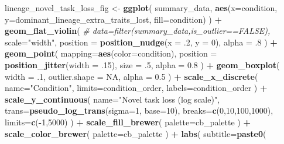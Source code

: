 \documentclass[]{book}
\newenvironment{Shaded}{\begin{snugshade}}{\end{snugshade}}
\newcommand{\CommentTok}[1]{\textcolor[rgb]{0.56,0.35,0.01}{\textit{#1}}}
\newcommand{\DataTypeTok}[1]{\textcolor[rgb]{0.13,0.29,0.53}{#1}}
\newcommand{\DecValTok}[1]{\textcolor[rgb]{0.00,0.00,0.81}{#1}}
\newcommand{\FloatTok}[1]{\textcolor[rgb]{0.00,0.00,0.81}{#1}}
\newcommand{\KeywordTok}[1]{\textcolor[rgb]{0.13,0.29,0.53}{\textbf{#1}}}
\newcommand{\NormalTok}[1]{#1}
\newcommand{\OperatorTok}[1]{\textcolor[rgb]{0.81,0.36,0.00}{\textbf{#1}}}
\newcommand{\OtherTok}[1]{\textcolor[rgb]{0.56,0.35,0.01}{#1}}
\newcommand{\StringTok}[1]{\textcolor[rgb]{0.31,0.60,0.02}{#1}}
\begin{document}
\begin{Shaded}
\begin{Highlighting}[]
{{{{\NormalTok{lineage_novel_task_loss_fig <-}\StringTok{ }\KeywordTok{ggplot}\NormalTok{(}
\NormalTok{    summary_data,}
    \KeywordTok{aes}\NormalTok{(}\DataTypeTok{x=}\NormalTok{condition, }\DataTypeTok{y=}\NormalTok{dominant_lineage_extra_traits_lost, }\DataTypeTok{fill=}\NormalTok{condition)}
\NormalTok{  ) }\OperatorTok{+}
\StringTok{  }\KeywordTok{geom_flat_violin}\NormalTok{(}
    \CommentTok{# data=filter(summary_data,is_outlier==FALSE),}
    \DataTypeTok{scale=}\StringTok{"width"}\NormalTok{,}
    \DataTypeTok{position =} \KeywordTok{position_nudge}\NormalTok{(}\DataTypeTok{x =} \FloatTok{.2}\NormalTok{, }\DataTypeTok{y =} \DecValTok{0}\NormalTok{),}
    \DataTypeTok{alpha =} \FloatTok{.8}
\NormalTok{  ) }\OperatorTok{+}
\StringTok{  }\KeywordTok{geom_point}\NormalTok{(}
    \DataTypeTok{mapping=}\KeywordTok{aes}\NormalTok{(}\DataTypeTok{color=}\NormalTok{condition),}
    \DataTypeTok{position =} \KeywordTok{position_jitter}\NormalTok{(}\DataTypeTok{width =} \FloatTok{.15}\NormalTok{),}
    \DataTypeTok{size =} \FloatTok{.5}\NormalTok{,}
    \DataTypeTok{alpha =} \FloatTok{0.8}
\NormalTok{  ) }\OperatorTok{+}
\StringTok{  }\KeywordTok{geom_boxplot}\NormalTok{(}
    \DataTypeTok{width =} \FloatTok{.1}\NormalTok{,}
    \DataTypeTok{outlier.shape =} \OtherTok{NA}\NormalTok{,}
    \DataTypeTok{alpha =} \FloatTok{0.5}
\NormalTok{  ) }\OperatorTok{+}
\StringTok{  }\KeywordTok{scale_x_discrete}\NormalTok{(}
    \DataTypeTok{name=}\StringTok{"Condition"}\NormalTok{,}
    \DataTypeTok{limits=}\NormalTok{condition_order,}
    \DataTypeTok{labels=}\NormalTok{condition_order}
\NormalTok{  ) }\OperatorTok{+}
\StringTok{  }\KeywordTok{scale_y_continuous}\NormalTok{(}
    \DataTypeTok{name=}\StringTok{"Novel task loss (log scale)"}\NormalTok{,}
    \DataTypeTok{trans=}\KeywordTok{pseudo_log_trans}\NormalTok{(}\DataTypeTok{sigma=}\DecValTok{1}\NormalTok{, }\DataTypeTok{base=}\DecValTok{10}\NormalTok{),}
    \DataTypeTok{breaks=}\KeywordTok{c}\NormalTok{(}\DecValTok{0}\NormalTok{,}\DecValTok{10}\NormalTok{,}\DecValTok{100}\NormalTok{,}\DecValTok{1000}\NormalTok{),}
    \DataTypeTok{limits=}\KeywordTok{c}\NormalTok{(}\OperatorTok{-}\DecValTok{1}\NormalTok{,}\DecValTok{5000}\NormalTok{)}
\NormalTok{  ) }\OperatorTok{+}
\StringTok{  }\KeywordTok{scale_fill_brewer}\NormalTok{(}
    \DataTypeTok{palette=}\NormalTok{cb_palette}
\NormalTok{  ) }\OperatorTok{+}
\StringTok{  }\KeywordTok{scale_color_brewer}\NormalTok{(}
    \DataTypeTok{palette=}\NormalTok{cb_palette}
\NormalTok{  ) }\OperatorTok{+}
\StringTok{  }\KeywordTok{labs}\NormalTok{(}
    \DataTypeTok{subtitle=}\KeywordTok{paste0}\NormalTok{(}
}}}}
\end{Highlighting}
\end{Shaded}
\end{document}
